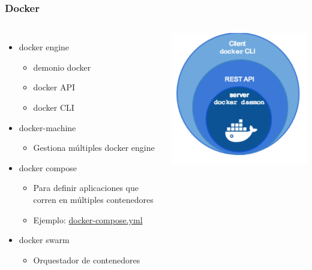 \documentclass[aspectratio=169]{beamer}
\begin{document}
\begin{frame}
  \frametitle{Docker}
  \begin{columns}
    \begin{itemize}
    \item docker engine
      \begin{itemize}
      \item demonio docker
      \item docker API
      \item docker CLI
      \end{itemize}
    \item docker-machine
      \begin{itemize}
      \item Gestiona múltiples docker engine
      \end{itemize}
    \item docker compose
      \begin{itemize}
      \item Para definir aplicaciones que corren en múltiples contenedores
      \item Ejemplo: \href{https://github.com/bitnami/bitnami-docker-wordpress/blob/master/docker-compose.yml}{docker-compose.yml}
      \end{itemize}
      \item docker swarm
        \begin{itemize}
        \item Orquestador de contenedores
        \end{itemize}
      \end{itemize}
      \includegraphics[width=\textwidth]{img/docker-engine.png}
  \end{columns}
\end{frame}
\end{document}

